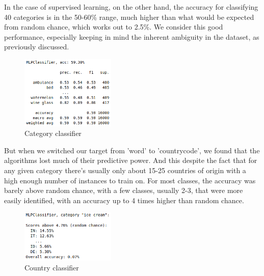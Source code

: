 \documentclass[a4paper, twocolumn]{article}
\begin{document}
In the case of supervised learning, on the other hand, the accuracy for classifying 40 categories is in the 50-60\% range, much higher than what would be expected from random chance, which works out to 2.5\%. We consider this good performance, especially keeping in mind the inherent ambiguity in the dataset, as previously discussed.

    \begin{figure}[H]
        \centering
        \includegraphics[width=0.4\textwidth]{figures/supervised.png}
        \caption{Category classifier}
        \label{fig:supervised}
    \end{figure}

But when we switched our target from 'word' to 'countrycode', we found that the algorithms lost much of their predictive power. And this despite the fact that for any given category there's usually only about 15-25 countries of origin with a high enough number of instances to train on. For most classes, the accuracy was barely above random chance, with a few classes, usually 2-3, that were more easily identified, with an accuracy up to 4 times higher than random chance.

    \begin{figure}[H]
        \centering
        \includegraphics[width=0.4\textwidth]{figures/supervised2.png}
        \caption{Country classifier}
        \label{fig:supervised2}
    \end{figure}
\end{document}
